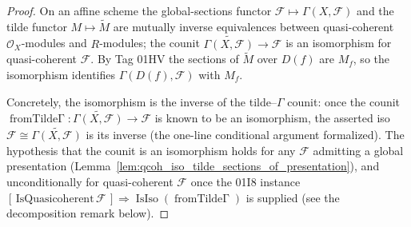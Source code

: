 \begin{proof}
  On an affine scheme the global-sections functor \(\mathcal{F} \mapsto \Gamma(X, \mathcal{F})\) and
  the tilde functor \(M \mapsto \widetilde{M}\) are mutually inverse equivalences between
  quasi-coherent \(\mathcal{O}_X\)-modules and \(R\)-modules; the counit
  \(\widetilde{\Gamma(X, \mathcal{F})} \to \mathcal{F}\) is an isomorphism for quasi-coherent
  \(\mathcal{F}\). By Tag 01HV the sections of \(\widetilde{M}\) over \(D(f)\) are \(M_f\), so the
  isomorphism identifies \(\Gamma(D(f), \mathcal{F})\) with \(M_f\).

  Concretely, the isomorphism is the inverse of the tilde–\(\Gamma\) counit: once the counit
  \(\operatorname{fromTilde\Gamma} : \widetilde{\Gamma(X, \mathcal{F})} \to \mathcal{F}\) is known to
  be an isomorphism, the asserted iso \(\mathcal{F} \cong \widetilde{\Gamma(X, \mathcal{F})}\) is its
  inverse (the one-line conditional argument formalized). The hypothesis that the counit is an
  isomorphism holds for any \(\mathcal{F}\) admitting a global presentation
  (Lemma~\ref{lem:qcoh_iso_tilde_sections_of_presentation}), and unconditionally for quasi-coherent
  \(\mathcal{F}\) once the 01I8 instance \([{\,}\mathrm{IsQuasicoherent}\,\mathcal{F}{\,}] \Rightarrow
  \operatorname{IsIso}(\operatorname{fromTilde\Gamma})\) is supplied (see the decomposition remark
  below).
\end{proof}

